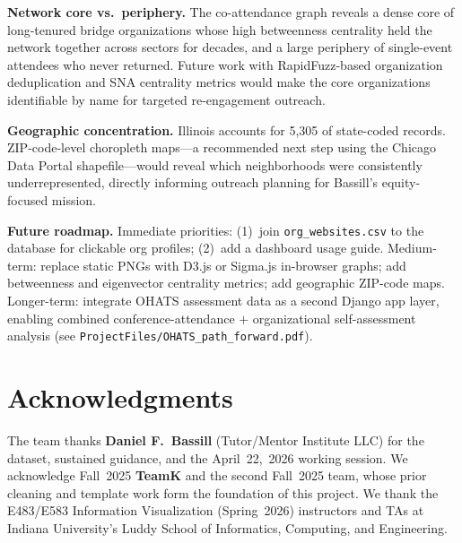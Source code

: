 \documentclass[10pt,twocolumn,letterpaper]{article}
\begin{document}
\textbf{Network core vs.\ periphery.} The co-attendance graph
reveals a dense core of long-tenured bridge organizations whose
high betweenness centrality held the network together across sectors
for decades, and a large periphery of single-event attendees who
never returned. Future work with RapidFuzz-based organization
deduplication and SNA centrality metrics would make the core
organizations identifiable by name for targeted re-engagement outreach.

\textbf{Geographic concentration.} Illinois accounts for 5,305 of
state-coded records. ZIP-code-level choropleth maps---a recommended
next step using the Chicago Data Portal shapefile---would reveal which
neighborhoods were consistently underrepresented, directly informing
outreach planning for Bassill's equity-focused mission.

\textbf{Future roadmap.} Immediate priorities: (1)~join
\texttt{org\_websites.csv} to the database for clickable org
profiles; (2)~add a dashboard usage guide.
Medium-term: replace static PNGs with D3.js or Sigma.js
in-browser graphs; add betweenness and eigenvector centrality
metrics; add geographic ZIP-code maps. Longer-term: integrate OHATS
assessment data as a second Django app layer, enabling combined
conference-attendance $+$ organizational self-assessment analysis
(see \texttt{ProjectFiles/OHATS\_path\_forward.pdf}).

\section*{Acknowledgments}

The team thanks \textbf{Daniel F.\ Bassill} (Tutor/Mentor Institute
LLC) for the dataset, sustained guidance, and the April~22,~2026
working session. We acknowledge Fall~2025 \textbf{TeamK} and the
second Fall~2025 team, whose prior cleaning and template work
form the foundation of this project. We thank the E483/E583
Information Visualization (Spring~2026) instructors and TAs
at Indiana University's Luddy School of Informatics, Computing,
and Engineering.
\end{document}
